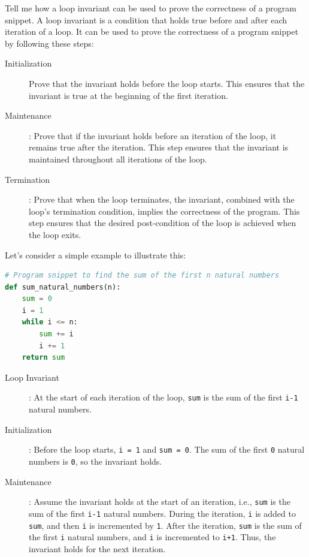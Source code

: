 \documentclass[twoside=false,DIV=14]{scrartcl}
\begin{document}
\begin{dialogue}
 Tell me how a loop invariant can be used to prove the correctness of a program snippet.
 A loop invariant is a condition that holds true before and after each iteration of a loop. It can be used to prove the correctness of a program snippet by following these steps:
\begin{description}
  \item[Initialization] Prove that the invariant holds before the loop starts. This ensures that the invariant is true at the beginning of the first iteration.

  \item[Maintenance]: Prove that if the invariant holds before an iteration of the loop, it remains true after the iteration. This step ensures that the invariant is maintained throughout all iterations of the loop.

  \item[Termination]: Prove that when the loop terminates, the invariant, combined with the loop's termination condition, implies the correctness of the program. This step ensures that the desired post-condition of the loop is achieved when the loop exits.
\end{description}
Let's consider a simple example to illustrate this:

\begin{lstlisting}[language=python]
# Program snippet to find the sum of the first n natural numbers
def sum_natural_numbers(n):
    sum = 0
    i = 1
    while i <= n:
        sum += i
        i += 1
    return sum
\end{lstlisting}

\begin{description}
  \item[Loop Invariant]: At the start of each iteration of the loop, \verb|sum| is the sum of the first \verb|i-1| natural numbers.

  \item[Initialization]: Before the loop starts, \verb|i = 1| and \verb|sum = 0|. The sum of the first \verb|0| natural numbers is \verb|0|, so the invariant holds.

  \item[Maintenance]: Assume the invariant holds at the start of an iteration, i.e., \verb|sum| is the sum of the first \verb|i-1| natural numbers. During the iteration, \verb|i| is added to \verb|sum|, and then \verb|i| is incremented by \verb|1|. After the iteration, \verb|sum| is the sum of the first \verb|i| natural numbers, and \verb|i| is incremented to \verb|i+1|. Thus, the invariant holds for the next iteration.


\end{description}
\end{dialogue}
\end{document}
